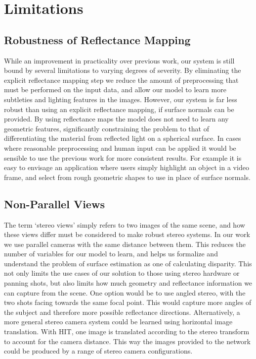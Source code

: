 \documentclass[ %
                    author={Gavin Parker},
                supervisor={Dr. Neill Campbell},
                    degree={MEng},
                     title={Deep Learning for Illumination Estimation from Stereo Images},
                  subtitle={},
                      type={Research},
                      year={2018} ]{dissertation}
\begin{document}
\section{Limitations}
\subsection{Robustness of Reflectance Mapping}
While an improvement in practicality over previous work, our system is still bound by several limitations to varying degrees of severity. By eliminating the explicit reflectance mapping step we reduce the amount of preprocessing that must be performed on the input data, and allow our model to learn more subtleties and lighting features in the images. However, our system is far less robust than using an explicit reflectance mapping, if surface normals can be provided. By using reflectance maps the model does not need to learn any geometric features, significantly constraining the problem to that of differentiating the material from reflected light on a spherical surface. In cases where reasonable preprocessing and human input can be applied it would be sensible to use the previous work for more consistent results. For example it is easy to envisage an application where users simply highlight an object in a video frame, and select from rough geometric shapes to use in place of surface normals.
\subsection{Non-Parallel Views}
The term `stereo views' simply refers to two images of the same scene, and how these views differ must be considered to make robust stereo systems. In our work we use parallel cameras with the same distance between them. This reduces the number of variables for our model to learn, and helps us formalize and understand the problem of surface estimation as one of calculating disparity. This not only limits the use cases of our solution to those using stereo hardware or panning shots, but also limits how much geometry and reflectance information we can capture from the scene. One option would be to use angled stereo, with the two shots facing towards the same focal point. This would capture more angles of the subject and therefore more possible reflectance directions. Alternatively, a more general stereo camera system could be learned using horizontal image translation. With HIT, one image is translated according to the stereo transform to account for the camera distance. This way the images provided to the network could be produced by a range of stereo camera configurations.
\newline
\end{document}
